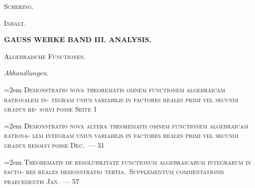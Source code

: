 \documentclass[12pt,a4paper]{article}
\begin{document}
\vspace{2em}
\hfill\textsc{Scher\-ing.}

\newpage

\begin{center}
\textsc{Inhalt.}
\end{center}

\vspace{1em}

\begin{center}
\textbf{GAUSS WERKE BAND III. ANALYSIS.}
\end{center}

\vspace{1em}

\begin{center}
\textsc{Algebraische Functionen.}
\end{center}

\vspace{0.5em}

\noindent\textit{Abhandlungen.}

\vspace{0.3em}
\noindent\hangindent=2em
\textsc{Demonstratio nova theorematis omnem functionem algebraicam rationalem in-\linebreak
\hspace*{\fill} tegram unius variabilis in factores reales primi vel secundi gradus re-\linebreak
\hspace*{\fill} solvi posse  \dotfill Seite 1}

\vspace{0.3em}
\noindent\hangindent=2em
\textsc{Demonstratio nova altera theorematis omnem functionem algebraicam rationa-\linebreak
\hspace*{\fill} lem integram unius variabilis in factores reales primi vel secundi gradus\linebreak
\hspace*{\fill} resolvi posse  Dec.\ \dotfill --- 31}

\vspace{0.3em}
\noindent\hangindent=2em
\textsc{Theorematis de resolubilitate functionum algebraicarum integrarum in facto-\linebreak
\hspace*{\fill} res reales demonstratio tertia.\ Supplementum commentationis praecedentis  Jan.\ \dotfill --- 57}
\end{document}
